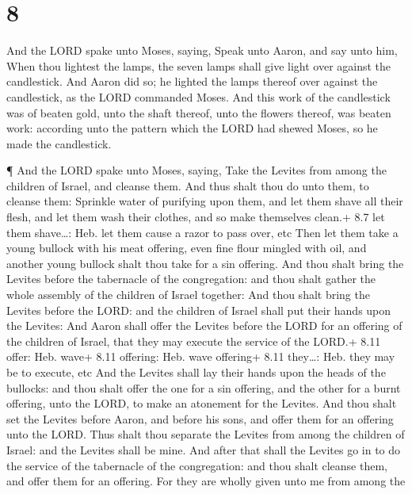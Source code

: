 \hypertarget{section-7}{%
\section{8}\label{section-7}}

 And the LORD spake unto Moses, saying,  Speak
unto Aaron, and say unto him, When thou lightest the lamps, the seven
lamps shall give light over against the candlestick.  And
Aaron did so; he lighted the lamps thereof over against the candlestick,
as the LORD commanded Moses.  And this work of the
candlestick was of beaten gold, unto the shaft thereof, unto the flowers
thereof, was beaten work: according unto the pattern which the LORD had
shewed Moses, so he made the candlestick.

 ¶ And the LORD spake unto Moses, saying,  Take
the Levites from among the children of Israel, and cleanse them.
 And thus shalt thou do unto them, to cleanse them: Sprinkle
water of purifying upon them, and let them shave all their flesh, and
let them wash their clothes, and so make themselves clean.+ 8.7 let them
shave\ldots: Heb. let them cause a razor to pass over, etc 
Then let them take a young bullock with his meat offering, even fine
flour mingled with oil, and another young bullock shalt thou take for a
sin offering.  And thou shalt bring the Levites before the
tabernacle of the congregation: and thou shalt gather the whole assembly
of the children of Israel together:  And thou shalt bring
the Levites before the LORD: and the children of Israel shall put their
hands upon the Levites:  And Aaron shall offer the Levites
before the LORD for an offering of the children of Israel, that they may
execute the service of the LORD.+ 8.11 offer: Heb. wave+ 8.11 offering:
Heb. wave offering+ 8.11 they\ldots: Heb. they may be to execute, etc
 And the Levites shall lay their hands upon the heads of
the bullocks: and thou shalt offer the one for a sin offering, and the
other for a burnt offering, unto the LORD, to make an atonement for the
Levites.  And thou shalt set the Levites before Aaron, and
before his sons, and offer them for an offering unto the LORD.
 Thus shalt thou separate the Levites from among the
children of Israel: and the Levites shall be mine.  And
after that shall the Levites go in to do the service of the tabernacle
of the congregation: and thou shalt cleanse them, and offer them for an
offering.  For they are wholly given unto me from among the
